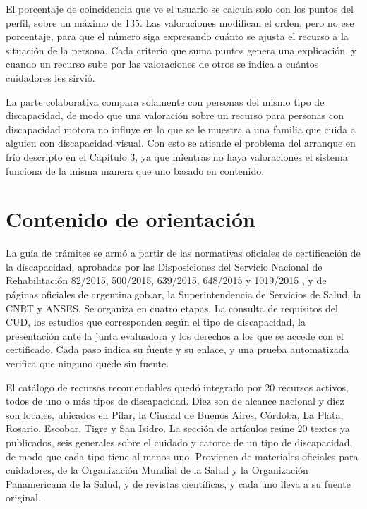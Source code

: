 El porcentaje de coincidencia que ve el usuario se calcula solo con los puntos del perfil, sobre un máximo de 135. Las valoraciones modifican el orden, pero no ese porcentaje, para que el número siga expresando cuánto se ajusta el recurso a la situación de la persona. Cada criterio que suma puntos genera una explicación, y cuando un recurso sube por las valoraciones de otros se indica a cuántos cuidadores les sirvió.

La parte colaborativa compara solamente con personas del mismo tipo de discapacidad, de modo que una valoración sobre un recurso para personas con discapacidad motora no influye en lo que se le muestra a una familia que cuida a alguien con discapacidad visual. Con esto se atiende el problema del arranque en frío descripto en el Capítulo 3, ya que mientras no haya valoraciones el sistema funciona de la misma manera que uno basado en contenido.

\section{Contenido de orientación}\label{sec:contenido}

La guía de trámites se armó a partir de las normativas oficiales de certificación de la discapacidad, aprobadas por las Disposiciones del Servicio Nacional de Rehabilitación 82/2015, 500/2015, 639/2015, 648/2015 y 1019/2015 \citep{snr82,snr500,snr639,snr648,snr1019}, y de páginas oficiales de argentina.gob.ar, la Superintendencia de Servicios de Salud, la CNRT y ANSES. Se organiza en cuatro etapas. La consulta de requisitos del CUD, los estudios que corresponden según el tipo de discapacidad, la presentación ante la junta evaluadora y los derechos a los que se accede con el certificado. Cada paso indica su fuente y su enlace, y una prueba automatizada verifica que ninguno quede sin fuente.

El catálogo de recursos recomendables quedó integrado por 20 recursos activos, todos de uno o más tipos de discapacidad. Diez son de alcance nacional y diez son locales, ubicados en Pilar, la Ciudad de Buenos Aires, Córdoba, La Plata, Rosario, Escobar, Tigre y San Isidro. La sección de artículos reúne 20 textos ya publicados, seis generales sobre el cuidado y catorce de un tipo de discapacidad, de modo que cada tipo tiene al menos uno. Provienen de materiales oficiales para cuidadores, de la Organización Mundial de la Salud y la Organización Panamericana de la Salud, y de revistas científicas, y cada uno lleva a su fuente original.

